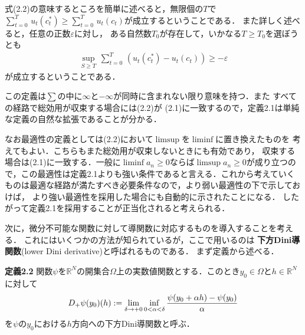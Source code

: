 \documentclass[a4paper,11pt]{jsarticle}
\DeclareRobustCommand{\lfrac}[2]{{\lower.4ex\hbox{\begingroup\ensuremath{#1}\endgroup}\over{\hspace{.2mm}#2\hspace{.2mm}}}}
\begin{document}
式(2.2)の意味するところを簡単に述べると，無限個の$T$で${\textstyle \sum_{t=0}^T}\, u_t(c_t^*)\geq {\textstyle \sum_{t=0}^T}\, u_t(c_t)$が成立するということである．
また詳しく述べると，任意の正数$\varepsilon$に対し，
ある自然数$T_0$が存在して，いかなる$T \geq T_0$を選ぼうとも
\begin{align*}
	\sup_{S\geq T}\, \sum_{t=0}^T \, \left(u_t(c_t^*)-u_t(c_t) \right)\geq -\varepsilon
\end{align*}
が成立するということである．

この定義は${\textstyle \sum}$の中に$\infty$と$-\infty$が同時に含まれない限り意味を持つ．また
すべての経路で総効用が収束する場合には(2.2)が
(2.1)に一致するので，定義2.1は単純な定義の自然な拡張であることが分かる．

なお最適性の定義としては(2.2)において$\limsup$を$\liminf$に置き換えたものを
考えてもよい．こちらもまた総効用が収束しないときにも有効であり，
収束する場合は(2.1)に一致する．一般に$\liminf a_n \geq 0$ならば$\limsup a_n \geq 0$が成り立つので，この最適性は定義2.1よりも強い条件であると言える．これから考えていくものは最適な経路が満たすべき必要条件なので，より弱い最適性の下で示しておけば，
より強い最適性を採用した場合にも自動的に示されたことになる．
したがって定義2.1を採用することが正当化されると考えられる．

\bigskip

次に，微分不可能な関数に対して導関数に対応するものを導入することを考える．
これにはいくつかの方法が知られているが，ここで用いるのは
\textbf{下方Dini導関数}(lower Dini derivative)と呼ばれるものである．
まず定義から述べる．

\vspace{7mm}
\noindent \textbf{定義2.2}\hspace*{.7mm} 関数$\psi$を$\mathbb{R}^N$の開集合$\varOmega$上の実数値関数とする．このとき$y_0 \in \varOmega$と$h \in \mathbb{R}^N$に対して
\begin{align*}
	D_{+}\psi(y_0)(h):=
	\lim_{\delta \to +0}\inf_{0<\alpha<\delta}\lfrac{\psi(y_0+\alpha h)-\psi(y_0)}{\alpha}
\end{align*}
を$\psi$の$y_0$における$h$方向への下方Dini導関数と呼ぶ．
\vspace{7mm}
\end{document}
